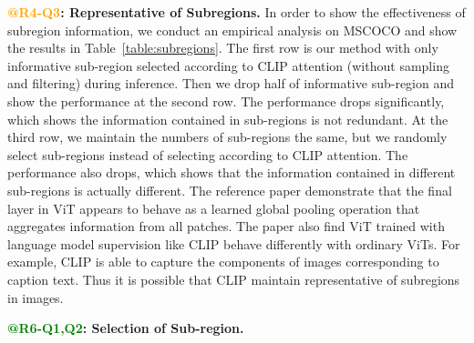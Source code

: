 \documentclass[letterpaper]{article} %
\begin{document}
\noindent \textbf{\textcolor{Orange}{@R4-Q3}: Representative of Subregions.}
In order to show the effectiveness of subregion information, we conduct an empirical analysis on MSCOCO and show the results in Table~\ref{table:subregions}. The first row is our method with only informative sub-region selected according to CLIP attention (without sampling and filtering) during inference.  Then we drop half of informative sub-region and show the performance at the second row. The performance drops significantly, which shows the information contained in sub-regions is not redundant. At the third row, we maintain the numbers of sub-regions the same, but we randomly select sub-regions instead of selecting according to CLIP attention. The performance also drops, which shows that the information contained in different sub-regions is actually different.
The reference paper demonstrate that the final layer in ViT appears to behave as a learned global pooling operation that aggregates information from all patches. The paper also find ViT trained with language model supervision like CLIP behave differently with ordinary ViTs. For example, CLIP is able to capture the components of images corresponding to caption text. Thus it is possible that CLIP maintain representative of subregions in images.



\noindent \textbf{\textcolor{Green}{@R6-Q1,Q2}: Selection of Sub-region.}
\end{document}
